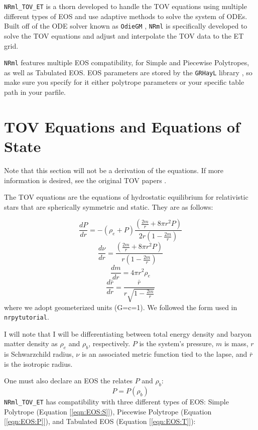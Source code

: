 {\tt NRml\_TOV\_ET} is a thorn developed to handle the TOV equations using multiple different types of EOS and use adaptive methods to solve the system of ODEs. Built off of the ODE solver known as {\tt OdieGM} \cite{Odie}, {\tt NRml} is specifically developed to solve the TOV equations and adjust and interpolate the TOV data to the ET grid.

{\tt NRml} features multiple EOS compatibility, for Simple and Piecewise Polytropes, as well as Tabulated EOS. EOS parameters are stored by the {\tt GRHayL} library \cite{GRHayL}, so make sure you specify for it either polytrope parameters or your specific table path in your parfile.

\section{TOV Equations and Equations of State}

Note that this section will not be a derivation of the equations. If more information is desired, see the original TOV papers \cite{Tolman, OppVol}.

The TOV equations are the equations of hydrostatic equilibrium for relativistic stars that are spherically symmetric and static. They are as follows:

\begin{equation}\label{eqn:TOVdP}
\frac{dP}{dr} = -(\rho_e+P)\frac{(\frac{2m}{r}+8\pi r^2P)}{2r(1-\frac{2m}{r})}
\end{equation}
\begin{equation}\label{eqn:TOVdnu}
\frac{d\nu}{dr} = \frac{(\frac{2m}{r}+8\pi r^2P)}{r(1-\frac{2m}{r})}
\end{equation}
\begin{equation}\label{eqn:TOVdM}
\frac{dm}{dr} = 4\pi r^2 \rho_e
\end{equation}
\begin{equation}\label{eqn:TOVdrbar}
\frac{d\bar{r}}{dr} = \frac{\bar{r}}{r\sqrt{1-\frac{2m}{r}}}
\end{equation}
where we adopt geometerized units (G=c=1). We followed the form used in {\tt nrpytutorial}.\cite{NRpy}

I will note that I will be differentiating between total energy density and baryon matter density as $\rho_e$ and $\rho_b$, respectively. $P$ is the system's pressure, $m$ is mass, $r$ is Schwarzchild radius, $\nu$ is an associated metric function tied to the lapse, and $\bar{r}$ is the isotropic radius.

One must also declare an EOS the relates $P$ and $\rho_b$:
\begin{equation}\label{eqn:EOS}
P=P(\rho_b)
\end{equation}
{\tt NRml\_TOV\_ET} has compatibility with three different types of EOS: Simple Polytrope (Equation [\ref{eqn:EOS:S}]), Piecewise Polytrope (Equation [\ref{eqn:EOS:P}]), and Tabulated EOS (Equation [\ref{eqn:EOS:T}]):

